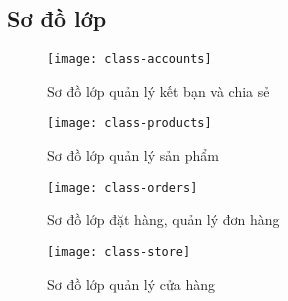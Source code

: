 \clearpage
\subsection{Sơ đồ lớp}
\FloatBarrier
\begin{figure}[!htbp]\fontsize{13px}{13px}\selectfont
	\centering
	\texttt{[image: class-accounts]}
	\caption{Sơ đồ lớp quản lý kết bạn và chia sẻ}
\end{figure}

\FloatBarrier
\begin{figure}[!htbp]\fontsize{13px}{13px}\selectfont
	\centering
	\texttt{[image: class-products]}
	\caption{Sơ đồ lớp quản lý sản phẩm}
\end{figure}

\clearpage
\FloatBarrier
\begin{figure}[!htbp]\fontsize{13px}{13px}\selectfont
	\centering
	\texttt{[image: class-orders]}
	\caption{Sơ đồ lớp đặt hàng, quản lý đơn hàng}
\end{figure}
\FloatBarrier
\begin{figure}[!htbp]\fontsize{13px}{13px}\selectfont
	\centering
	\texttt{[image: class-store]}
	\caption{Sơ đồ lớp quản lý cửa hàng}
\end{figure}